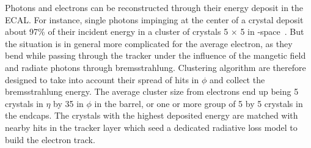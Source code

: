 \indent Photons and electrons can be reconstructed through their energy deposit in the ECAL. 
For instance, single photons impinging at the center of a crystal deposit about 97\% of their 
incident energy in a cluster of crystals 5 $\times$ 5 in \eta-\phi space~\cite{Bayatian:922757}. 
But the situation is in general more complicated for the average electron, as they bend while passing through
the tracker under the influence of the mangetic field and radiate photons through bremsstrahlung.
Clustering algorithm are therefore designed to take into account their spread of hits in $\phi$ and collect 
the bremsstrahlung energy. The average cluster size from electrons end up being 5 crystals in $\eta$ 
by 35 in $\phi$ in the barrel, or one or more group of 5 by 5 crystals in the endcaps. The crystals
with the highest deposited energy are matched with nearby hits in the tracker layer which seed a dedicated
radiative loss model to build the electron track.


%
%
%
